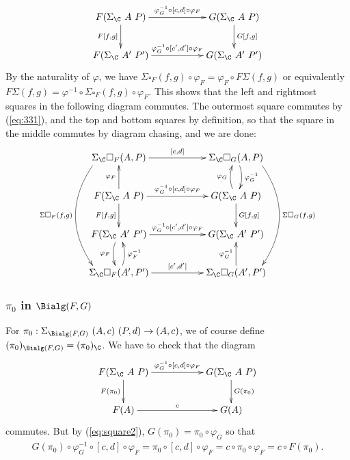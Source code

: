 \documentclass{article}
\begin{document}
\[
\xymatrix{
F(\Sigma_{\C}\ A\ P) \ar^-{\varphi^{-1}_G \circ [c, d] \circ \varphi_F}[rr] \ar_-{F[f, g]}[d] & & G(\Sigma_{\C}\ A\ P) \ar^-{G[f,g]}[d] \\
F(\Sigma_{\C}\ A'\ P') \ar^-{\varphi^{-1}_G \circ [c', d'] \circ \varphi_F}[rr] & & G(\Sigma_{\C}\ A'\ P')
}
\]
By the naturality of $\varphi$, we have $\Sigma\square_F(f, g) \circ
\varphi_F = \varphi_F \circ F\Sigma(f, g)$ or equivalently $F\Sigma(f,
g) = \varphi^{-1} \circ \Sigma\square_F(f, g) \circ \varphi_F$. This
shows that the left and rightmost squares in the following diagram
commutes. The outermost square commutes by (\ref{eq:331}), and the top
and bottom squares by definition, so that the square in the middle
commutes by diagram chasing, and we are done:
\[
\xymatrix{
\Sigma_{\C}\square_F(A,P) \ar^-{[c, d]}[rr]  \ar_-{\Sigma\square_F(f, g)}@<-5ex>@/_2pc/[ddd] & & \Sigma_{\C}\square_G(A,P) \ar^-{\varphi^{-1}_G}@/^/[d] \ar^-{\Sigma\square_G(f, g)}@<5ex>@/^2pc/[ddd] \\
F(\Sigma_{\C}\ A\ P) \ar^-{\varphi_F}[u] \ar^-{\varphi^{-1}_G \circ [c, d] \circ \varphi_F}[rr] \ar_-{F[f, g]}[d] & & G(\Sigma_{\C}\ A\ P) \ar^-{G[f,g]}[d] \ar^-{\varphi_G}@/^/[u] \\
F(\Sigma_{\C}\ A'\ P') \ar_-{\varphi_F}@/_/[d] \ar^-{\varphi^{-1}_G \circ [c', d'] \circ \varphi_F}[rr] & & G(\Sigma_{\C}\ A'\ P') \\
\Sigma_{\C}\square_F(A',P') \ar_-{\varphi^{-1}_F}@/_/[u] \ar^-{[c', d']}[rr]  & & \Sigma_{\C}\square_G(A',P') \ar^-{\varphi^{-1}_G}[u] 
}
\]

\subsubsection{$\pi_0$ in $\Bialg(F, G)$}

For $\pi_0 : \Sigma_{\Bialg(F, G)}\ (A, c)\ (P, d) \to (A, c)$, we of course define $(\pi_0)_{\Bialg(F, G)} = (\pi_0)_{\C}$. We have to check that the diagram
\[
\xymatrix{
F(\Sigma_{\C}\ A\ P) \ar^-{\varphi^{-1}_G \circ [c, d] \circ \varphi_F}[rr] \ar_-{F(\pi_0)}[d] & & G(\Sigma_{\C}\ A\ P) \ar^-{G(\pi_0)}[d] \\
F(A) \ar^-{c}[rr] & & G(A)
}
\]
commutes. But by (\ref{eq:square2}), $G(\pi_0) = \pi_0 \circ \varphi_G$ so that
\begin{align*}
  G(\pi_0) \circ \varphi^{-1}_G \circ [c, d] \circ \varphi_F
  = \pi_0 \circ [c, d] \circ \varphi_F %
  = c \circ \pi_0  \circ \varphi_F %
  = c \circ F(\pi_0).
\end{align*}
\end{document}
